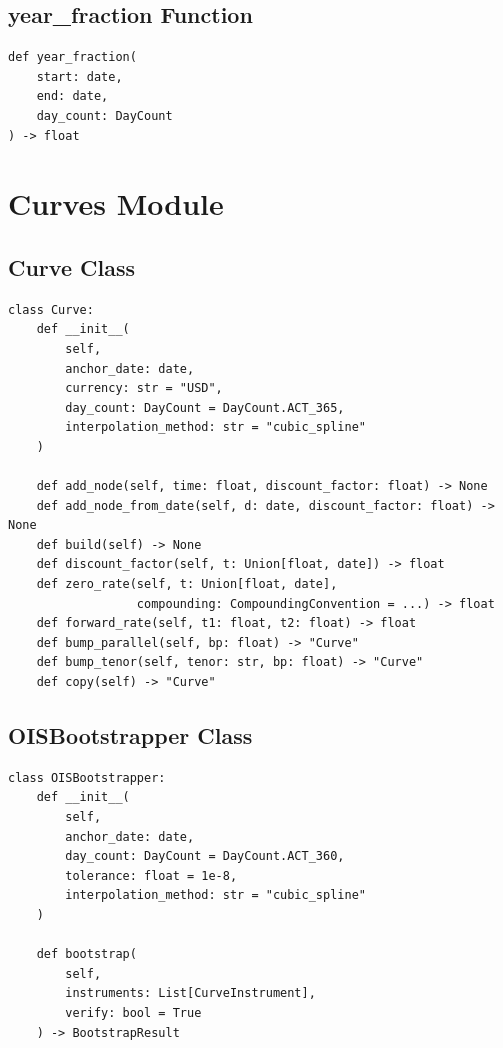\documentclass[12pt,a4paper]{report}
\begin{document}
\subsection{year\_fraction Function}

\begin{lstlisting}
def year_fraction(
    start: date, 
    end: date, 
    day_count: DayCount
) -> float
\end{lstlisting}

\section{Curves Module}

\subsection{Curve Class}

\begin{lstlisting}
class Curve:
    def __init__(
        self,
        anchor_date: date,
        currency: str = "USD",
        day_count: DayCount = DayCount.ACT_365,
        interpolation_method: str = "cubic_spline"
    )
    
    def add_node(self, time: float, discount_factor: float) -> None
    def add_node_from_date(self, d: date, discount_factor: float) -> None
    def build(self) -> None
    def discount_factor(self, t: Union[float, date]) -> float
    def zero_rate(self, t: Union[float, date], 
                  compounding: CompoundingConvention = ...) -> float
    def forward_rate(self, t1: float, t2: float) -> float
    def bump_parallel(self, bp: float) -> "Curve"
    def bump_tenor(self, tenor: str, bp: float) -> "Curve"
    def copy(self) -> "Curve"
\end{lstlisting}

\subsection{OISBootstrapper Class}

\begin{lstlisting}
class OISBootstrapper:
    def __init__(
        self,
        anchor_date: date,
        day_count: DayCount = DayCount.ACT_360,
        tolerance: float = 1e-8,
        interpolation_method: str = "cubic_spline"
    )
    
    def bootstrap(
        self,
        instruments: List[CurveInstrument],
        verify: bool = True
    ) -> BootstrapResult
\end{lstlisting}
\end{document}
